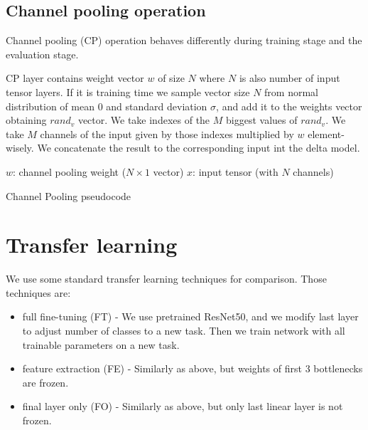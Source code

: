 \documentclass[12pt]{article}
\begin{document}
    \subsection{Channel pooling operation}

    Channel pooling (CP) operation behaves differently during training stage and the evaluation stage.

    CP layer contains weight vector $w$ of size $N$ where $N$ is also number of input tensor layers.
    If it is training time we sample vector size $N$ from normal distribution of mean 0 and standard deviation $\sigma$, and add it to the weights vector obtaining $rand_v$ vector.
    We take indexes of the $M$ biggest values of $rand_v$.
    We take $M$ channels of the input given by those indexes multiplied by $w$ element-wisely.
    We concatenate the result to the corresponding input int the delta model.

    \begin{algorithm}
        $w$: channel pooling weight ($N\times1$ vector)\;
        $x$: input tensor (with $N$ channels)\;
        \caption{Channel Pooling pseudocode}\label{alg:algorithm}
    \end{algorithm}


    \section{Transfer learning}

    We use some standard transfer learning techniques for comparison.
    Those techniques are:
    \begin{itemize}
        \item full fine-tuning (FT) - We use pretrained ResNet50, and we modify last layer to adjust number of classes to a new task. Then we train network with all trainable parameters on a new task.
        \item feature extraction (FE) - Similarly as above, but weights of first 3 bottlenecks are frozen.
        \item final layer only (FO) - Similarly as above, but only last linear layer is not frozen.
    \end{itemize}
\end{document}
